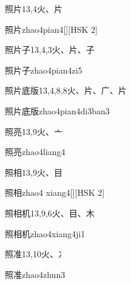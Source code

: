 \begin{entry}{照片}{13,4}{⽕、⽚}
  \begin{phonetics}{照片}{zhao4pian4}[][HSK 2]
  \end{phonetics}
\end{entry}

\begin{entry}{照片子}{13,4,3}{⽕、⽚、⼦}
  \begin{phonetics}{照片子}{zhao4pian4zi5}
  \end{phonetics}
\end{entry}

\begin{entry}{照片底版}{13,4,8,8}{⽕、⽚、⼴、⽚}
  \begin{phonetics}{照片底版}{zhao4pian4di3ban3}
  \end{phonetics}
\end{entry}

\begin{entry}{照亮}{13,9}{⽕、⼇}
  \begin{phonetics}{照亮}{zhao4liang4}
  \end{phonetics}
\end{entry}

\begin{entry}{照相}{13,9}{⽕、⽬}
  \begin{phonetics}{照相}{zhao4 xiang4}[][HSK 2]
  \end{phonetics}
\end{entry}

\begin{entry}{照相机}{13,9,6}{⽕、⽬、⽊}
  \begin{phonetics}{照相机}{zhao4xiang4ji1}
  \end{phonetics}
\end{entry}

\begin{entry}{照准}{13,10}{⽕、⼎}
  \begin{phonetics}{照准}{zhao4zhun3}
  \end{phonetics}
\end{entry}

